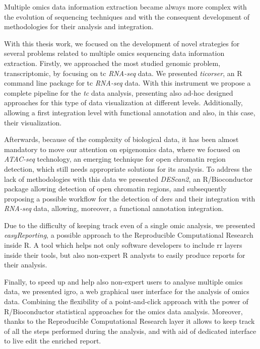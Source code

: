 Multiple omics data information extraction became always more complex with the evolution of sequencing techniques and with the consequent development of methodologies for their analysis and integration.

With this thesis work, we focused on the development of novel strategies for several problems related to multiple omics sequencing data information extraction.
Firstly, we approached the most studied genomic problem, transcriptomic, by focusing on \gls{tc} \textit{RNA-seq} data.
We presented \textit{ticorser}, an R command line package for \gls{tc} \textit{RNA-seq} data.
With this instrument we propose a complete pipeline for the \textit{tc} data analysis, presenting also ad-hoc designed approaches for this type of data visualization at different levels.
Additionally, allowing a first integration level with functional annotation and also, in this case, their visualization.

Afterwards, because of the complexity of biological data, it has been almost mandatory to move our attention on epigenomics data, where we focused on \textit{ATAC-seq} technology, an emerging technique for open chromatin region detection, which still needs appropriate solutions for its analysis.
To address the lack of methodologies with this data we presented \textit{DEScan2}, an R/Bioconductor package allowing detection of open chromatin regions, and subsequently proposing a possible workflow for the detection of \glspl{der} and their integration with \textit{RNA-seq} data, allowing, moreover, a functional annotation integration.

Due to the difficulty of keeping track even of a single omic analysis, we presented \textit{easyReporting}, a possible approach to the Reproducible Computational Research inside R.
A tool which helps not only software developers to include \gls{rr} layers inside their tools, but also non-expert R analysts to easily produce reports for their analysis.

Finally, to speed up and help also non-expert users to analyse multiple omics data, we presented \gls{igro}, a web graphical user interface for the analysis of omics data.
Combining the flexibility of a point-and-click approach with the power of R/Bioconductor statistical approaches for the omics data analysis.
Moreover, thanks to the Reproducible Computational Research layer it allows to keep track of all the steps performed during the analysis, and with aid of dedicated interface to live edit the enriched report.